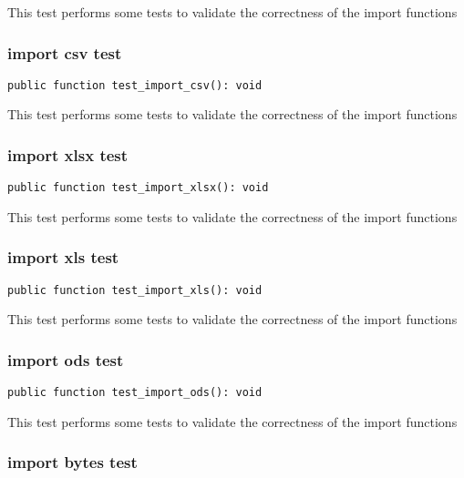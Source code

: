 \documentclass[a4paper]{article}
\begin{document}
This test performs some tests to validate the correctness
of the import functions

\hypertarget{toc258}{}
\subsubsection{import csv test}

\begin{lstlisting}
public function test_import_csv(): void
\end{lstlisting}

This test performs some tests to validate the correctness
of the import functions

\hypertarget{toc259}{}
\subsubsection{import xlsx test}

\begin{lstlisting}
public function test_import_xlsx(): void
\end{lstlisting}

This test performs some tests to validate the correctness
of the import functions

\hypertarget{toc260}{}
\subsubsection{import xls test}

\begin{lstlisting}
public function test_import_xls(): void
\end{lstlisting}

This test performs some tests to validate the correctness
of the import functions

\hypertarget{toc261}{}
\subsubsection{import ods test}

\begin{lstlisting}
public function test_import_ods(): void
\end{lstlisting}

This test performs some tests to validate the correctness
of the import functions

\hypertarget{toc262}{}
\subsubsection{import bytes test}
\end{document}
